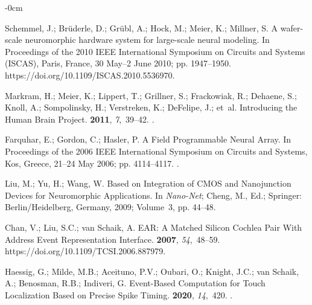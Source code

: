 \documentclass[brainsci, %
               review,accept,pdftex,moreauthors
               ]{Definitions/mdpi}
\begin{document}
\begin{adjustwidth}{-\extralength}{0cm}
\begin{thebibliography}{999}
Schemmel, J.; Brüderle, D.; Grübl, A.; Hock, M.; Meier, K.; Millner, S.
\newblock A wafer-scale neuromorphic hardware system for large-scale neural
  modeling.
\newblock In Proceedings of the 2010 {IEEE} {International} {Symposium} on
  {Circuits} and {Systems} ({ISCAS}), {Paris, France, 30 May--2 June} %
 2010; pp. 1947--1950.
{{https://doi.org/10.1109/ISCAS.2010.5536970}}.

Markram, H.; Meier, K.; Lippert, T.; Grillner, S.; Frackowiak, R.; Dehaene, S.;
  Knoll, A.; Sompolinsky, H.; Verstreken, K.; DeFelipe, J.;  et~al.
\newblock Introducing the {Human} {Brain} {Project}.
 {\bf 2011}, {\em 7},~39--42.
.

Farquhar, E.; Gordon, C.; Hasler, P.
\newblock A {Field} {Programmable} {Neural} {Array}.
\newblock In Proceedings of the 2006 {IEEE} {International} {Symposium} on
  {Circuits} and {Systems}, {Kos, Greece, 21--24 May} %
 2006; pp. 4114--4117.
.

Liu, M.; Yu, H.; Wang, W.
 {Based} on {Integration} of {CMOS} and {Nanojunction}
  {Devices} for {Neuromorphic} {Applications}. In {\em Nano-{Net}}; Cheng, M.,
  Ed.; Springer: Berlin/Heidelberg, Germany,  2009; Volume~3, pp.
  44--48.

Chan, V.; Liu, S.C.; van Schaik, A.
 {EAR}: {A} {Matched} {Silicon} {Cochlea} {Pair} {With}
  {Address} {Event} {Representation} {Interface}.
  {\bf 2007}, {\em 54},~48--59.
  {{https://doi.org/10.1109/TCSI.2006.887979}}.

Haessig, G.; Milde, M.B.; Aceituno, P.V.; Oubari, O.; Knight, J.C.; van Schaik,
  A.; Benosman, R.B.; Indiveri, G.
\newblock Event-{Based} {Computation} for {Touch} {Localization} {Based} on
  {Precise} {Spike} {Timing}.
 {\bf 2020}, {\em 14},~420.
.


\end{thebibliography}
\end{adjustwidth}
\end{document}
